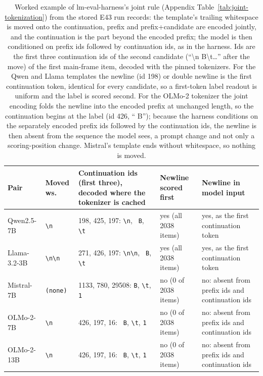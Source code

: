 \begin{table}[t]
\centering\scriptsize
\setlength{\tabcolsep}{4pt}
\begin{tabular}{@{}llp{5.2cm}p{2.6cm}p{2.4cm}@{}}
\toprule
Pair & Moved ws. & Continuation ids (first three), decoded where the tokenizer is cached & Newline scored first & Newline in model input \\
\midrule
Qwen2.5-7B & \texttt{\textbackslash{}n} & 198, 425, 197: \texttt{\textbackslash{}n}, \texttt{ B}, \texttt{\textbackslash{}t} & yes (all 2038 items) & yes, as the first continuation token \\
Llama-3.2-3B & \texttt{\textbackslash{}n\textbackslash{}n} & 271, 426, 197: \texttt{\textbackslash{}n\textbackslash{}n}, \texttt{ B}, \texttt{\textbackslash{}t} & yes (all 2038 items) & yes, as the first continuation token \\
Mistral-7B & \texttt{(none)} & 1133, 780, 29508: \texttt{B}, \texttt{\textbackslash{}t}, \texttt{1} & no (0 of 2038 items) & no: absent from prefix ids and continuation ids \\
OLMo-2-7B & \texttt{\textbackslash{}n} & 426, 197, 16: \texttt{ B}, \texttt{\textbackslash{}t}, \texttt{1} & no (0 of 2038 items) & no: absent from prefix ids and continuation ids \\
OLMo-2-13B & \texttt{\textbackslash{}n} & 426, 197, 16: \texttt{ B}, \texttt{\textbackslash{}t}, \texttt{1} & no (0 of 2038 items) & no: absent from prefix ids and continuation ids \\
\bottomrule
\end{tabular}
\caption{Worked example of lm-eval-harness's joint rule (Appendix Table~\ref{tab:joint-tokenization}) from the stored E43 run records: the template's trailing whitespace is moved onto the continuation, prefix and prefix+candidate are encoded jointly, and the continuation is the part beyond the encoded prefix; the model is then conditioned on prefix ids followed by continuation ids, as in the harness. Ids are the first three continuation ids of the second candidate (``\textbackslash n B\textbackslash t\ldots'' after the move) of the first main-frame item, decoded with the pinned tokenizers. For the Qwen and Llama templates the newline (id 198) or double newline is the first continuation token, identical for every candidate, so a first-token label readout is uniform and the label is scored second. For the OLMo-2 tokenizer the joint encoding folds the newline into the encoded prefix at unchanged length, so the continuation begins at the label (id 426, `` B''); because the harness conditions on the separately encoded prefix ids followed by the continuation ids, the newline is then absent from the sequence the model sees, a prompt change and not only a scoring-position change. Mistral's template ends without whitespace, so nothing is moved.}
\label{tab:joint-example}
\end{table}
